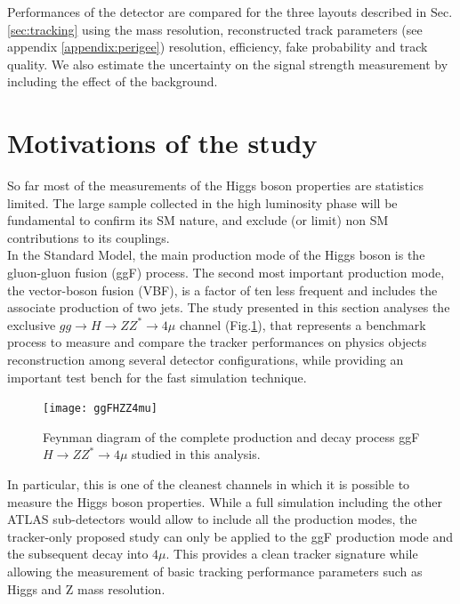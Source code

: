 \documentclass[a4paper,twoside,12pt]{book}
\begin{document}
Performances of the detector are compared for the three layouts described in Sec.\ref{sec:tracking} 
using the mass resolution, reconstructed track parameters (see appendix \ref{appendix:perigee}) resolution, efficiency, fake probability
and track quality. We also estimate the uncertainty on the signal strength measurement by including the effect of the background.\\

\section{Motivations of the study}
So far most of the measurements of the Higgs boson properties are statistics limited. The large sample collected in the high luminosity phase will be
fundamental to confirm its SM nature, and exclude (or limit) non SM contributions to its couplings. \\

In the Standard Model, the main 
production mode of the Higgs boson is the gluon-gluon fusion (ggF) process. The second most 
important production mode, the vector-boson fusion (VBF), is a factor of ten less frequent and includes the associate
production of two jets. The study presented in this section analyses the exclusive
$gg \rightarrow H \rightarrow ZZ^* \rightarrow 4\mu$ channel (Fig.\ref{fig:ggFHZZ4mu}), that represents a benchmark process to measure and compare the tracker performances on physics objects reconstruction among several detector
configurations, while providing an important test bench for the fast simulation technique.\\

\begin{figure} [h]
	\centering
	\texttt{[image: ggFHZZ4mu]}
	\caption{Feynman diagram of the complete production and decay process 
	ggF $H \rightarrow ZZ^* \rightarrow 4\mu$ studied in 
	this analysis.}
	\label{fig:ggFHZZ4mu}
\end{figure}

In particular, this is one of the cleanest channels in which it is possible to measure the Higgs boson properties. While a full 
simulation including the other ATLAS sub-detectors would allow to include all the
production modes, the tracker-only proposed study can only
be applied to the ggF production mode and the subsequent decay into $4\mu$. This provides a clean tracker signature while
allowing the measurement of basic tracking performance parameters such as Higgs and Z mass resolution.
\end{document}
